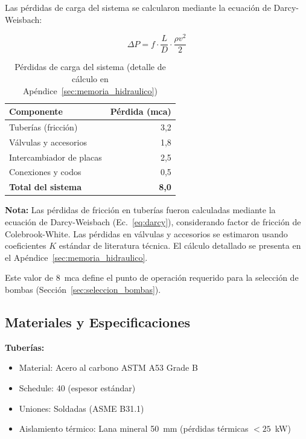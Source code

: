 \documentclass[12pt,a4paper]{article}
\begin{document}
Las pérdidas de carga del sistema se calcularon mediante la ecuación de Darcy-Weisbach:

\begin{equation}
\label{eq:darcy}
\Delta P = f \cdot \frac{L}{D} \cdot \frac{\rho v^2}{2}
\end{equation}

\begin{table}[h]
\centering
\caption{Pérdidas de carga del sistema (detalle de cálculo en Apéndice~\ref{sec:memoria_hidraulico})}
\label{tab:perdidas_carga}
\begin{tabular}{lr}
\toprule
\textbf{Componente} & \textbf{Pérdida (mca)} \\
\midrule
Tuberías (fricción) & 3,2 \\
Válvulas y accesorios & 1,8 \\
Intercambiador de placas & 2,5 \\
Conexiones y codos & 0,5 \\
\midrule
\textbf{Total del sistema} & \textbf{8,0} \\
\bottomrule
\end{tabular}
\end{table}

\textbf{Nota:} Las pérdidas de fricción en tuberías fueron calculadas mediante la ecuación de Darcy-Weisbach (Ec.~\ref{eq:darcy}), considerando factor de fricción de Colebrook-White. Las pérdidas en válvulas y accesorios se estimaron usando coeficientes $K$ estándar de literatura técnica. El cálculo detallado se presenta en el Apéndice~\ref{sec:memoria_hidraulico}.

Este valor de 8~mca define el punto de operación requerido para la selección de bombas (Sección~\ref{sec:seleccion_bombas}).

\subsection{Materiales y Especificaciones}

\textbf{Tuberías:}
\begin{itemize}
    \item Material: Acero al carbono ASTM A53 Grade B
    \item Schedule: 40 (espesor estándar)
    \item Uniones: Soldadas (ASME B31.1)
    \item Aislamiento térmico: Lana mineral 50~mm (pérdidas térmicas $< 25$~kW)
\end{itemize}
\end{document}
